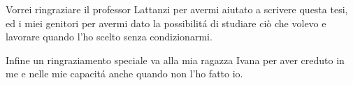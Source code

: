 \documentclass[a4paper,singleside,11pt]{report}
\begin{document}

\copertinatesi
{}
\indice
\indicefigure
\iniziatesto





%

\appendix
%


\ringraziamenti
Vorrei ringraziare il professor Lattanzi per avermi aiutato a scrivere questa tesi, ed i miei genitori per avermi dato la possibilit\'a di studiare ci\`o che volevo e lavorare quando l'ho scelto senza condizionarmi.

Infine un ringraziamento speciale va alla mia ragazza Ivana per aver creduto in me e nelle mie capacit\'a anche quando non l'ho fatto io.
\end{document}
